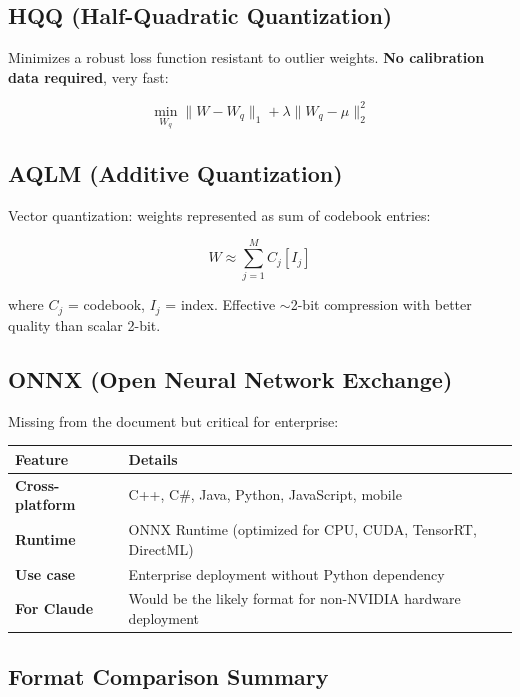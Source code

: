 \documentclass[11pt,a4paper]{article}
\begin{document}
\subsection{HQQ (Half-Quadratic Quantization)}

Minimizes a robust loss function resistant to outlier weights. \textbf{No calibration data required}, very fast:

$$\min_{W_q} \|W - W_q\|_1 + \lambda \|W_q - \mu\|_2^2$$

\subsection{AQLM (Additive Quantization)}

Vector quantization: weights represented as sum of codebook entries:

$$W \approx \sum_{j=1}^{M} C_j[I_j]$$

where $C_j$ = codebook, $I_j$ = index. Effective $\sim$2-bit compression with better quality than scalar 2-bit.

\subsection{ONNX (Open Neural Network Exchange)}

Missing from the document but critical for enterprise:

\begin{center}
\begin{tabular}{lL{9cm}}
\toprule
\textbf{Feature} & \textbf{Details} \\
\midrule
\textbf{Cross-platform} & C++, C\#, Java, Python, JavaScript, mobile \\
\textbf{Runtime} & ONNX Runtime (optimized for CPU, CUDA, TensorRT, DirectML) \\
\textbf{Use case} & Enterprise deployment without Python dependency \\
\textbf{For Claude} & Would be the likely format for non-NVIDIA hardware deployment \\
\bottomrule
\end{tabular}
\end{center}

\subsection{Format Comparison Summary}
\end{document}
